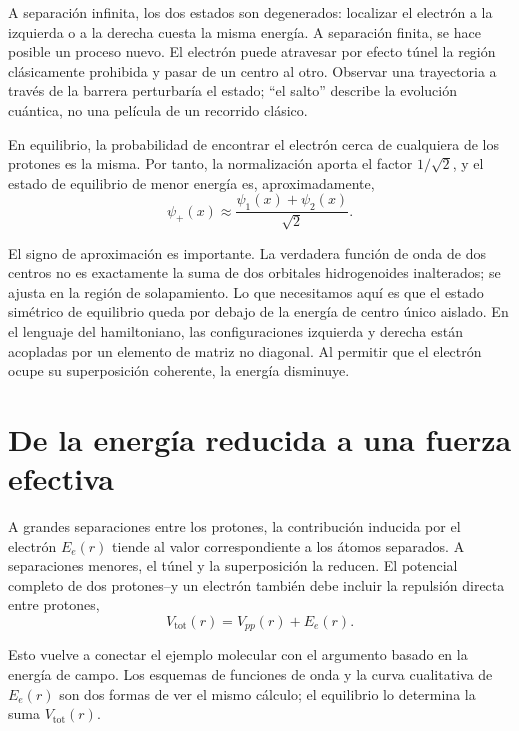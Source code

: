 A separación infinita, los dos estados son degenerados: localizar el electrón a la izquierda o a la derecha cuesta la misma energía. A separación finita, se hace posible un proceso nuevo. El electrón puede atravesar por efecto túnel la región clásicamente prohibida y pasar de un centro al otro. Observar una trayectoria a través de la barrera perturbaría el estado; ``el salto'' describe la evolución cuántica, no una película de un recorrido clásico.

En equilibrio, la probabilidad de encontrar el electrón cerca de cualquiera de los protones es la misma. Por tanto, la normalización aporta el factor \(1/\sqrt2\), y el estado de equilibrio de menor energía es, aproximadamente,
\begin{equation}
\psi_+(x)\approx \frac{\psi_1(x)+\psi_2(x)}{\sqrt2}.
\end{equation}

El signo de aproximación es importante. La verdadera función de onda de dos centros no es exactamente la suma de dos orbitales hidrogenoides inalterados; se ajusta en la región de solapamiento. Lo que necesitamos aquí es que el estado simétrico de equilibrio queda por debajo de la energía de centro único aislado. En el lenguaje del hamiltoniano, las configuraciones izquierda y derecha están acopladas por un elemento de matriz no diagonal. Al permitir que el electrón ocupe su superposición coherente, la energía disminuye.

\section{De la energía reducida a una fuerza efectiva}

A grandes separaciones entre los protones, la contribución inducida por el electrón \(E_e(r)\) tiende al valor correspondiente a los átomos separados. A separaciones menores, el túnel y la superposición la reducen. El potencial completo de dos protones--y un electrón también debe incluir la repulsión directa entre protones,
\begin{equation}
V_{\mathrm{tot}}(r)=V_{pp}(r)+E_e(r).
\end{equation}

Esto vuelve a conectar el ejemplo molecular con el argumento basado en la energía de campo. Los esquemas de funciones de onda y la curva cualitativa de \(E_e(r)\) son dos formas de ver el mismo cálculo; el equilibrio lo determina la suma \(V_{\mathrm{tot}}(r)\).


